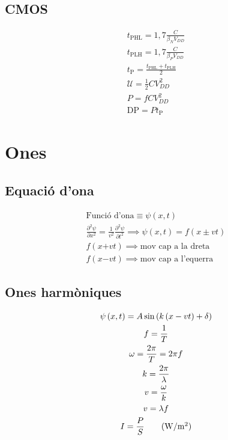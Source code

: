 \documentclass[10pt,twocolumn]{article}
\begin{document}
\subsection{CMOS}
\begin{gather*}
    t_\text{PHL} = 1,7\frac{C}{\beta_N V_{DD}} \\
    t_\text{PLH} = 1,7\frac{C}{\beta_P V_{DD}} \\
    t_\text{P} = \frac{t_\text{PHL} + t_\text{PLH}}{2} \\
    \mathcal{U} = \frac{1}{2} C V_{DD}^2 \\
    P = fCV_{DD}^2 \\
    \text{DP} = Pt_\text{P}
\end{gather*}

\section{Ones}
\subsection{Equació d'ona}
\begin{gather*}
    \text{Funció d'ona} \equiv \psi \left(x, t\right) \\
    \frac{\partial^2 \psi}{\partial x^2} = \frac{1}{v^2}\frac{\partial^2\psi}{\partial t^2} \implies \psi\left(x, t\right) = f\left(x \pm vt\right) \\
    f\left(x \bm{+} vt\right) \implies \text{mov cap a la dreta} \\
    f\left(x \bm{-} vt\right) \implies \text{mov cap a l'equerra}
\end{gather*}
\subsection{Ones harmòniques}
\begin{gather*}
    \psi\left(x, t\right) = A\sin\left(k\left(x - vt\right) + \delta \right) \\
    f = \frac{1}{T} \\
    \omega = \frac{2\pi}{T} = 2\pi f \\
    k = \frac{2\pi}{\lambda} \\
    v = \frac{\omega}{k} \\
    v = \lambda f \\
    I = \frac{P}{S} \tag{\si{W/m^2}}
\end{gather*}
\end{document}

